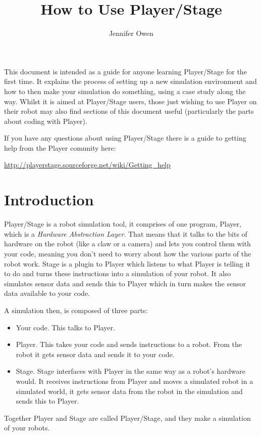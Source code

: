 \documentclass[a4paper]{article}
\title{How to Use Player/Stage}
\author{Jennifer Owen}
\newcommand{\plst}{Player/Stage\xspace}
\newcommand{\pl}{Player\xspace}
\begin{document}
\maketitle

This document is intended as a guide for anyone learning \plst for the first time. It explains the process of setting up a new simulation environment and how to then make your simulation do something, using a case study along the way. Whilst it is aimed at \plst users, those just wishing to use \pl on their robot may also find sections of this document useful (particularly the parts about coding with Player).

If you have any questions about using \plst there is a guide to getting help from the \pl comunity here:
\begin{center}
	\url{http://playerstage.sourceforge.net/wiki/Getting_help}
\end{center}

\newpage
\tableofcontents

\newpage
\section{Introduction}
\plst is a robot simulation tool, it comprises of one program, \pl, which is a \emph{Hardware Abstraction Layer}. That means that it talks to the bits of hardware on the robot (like a claw or a camera) and lets you control them with your code, meaning you don't need to worry about how the various parts of the robot work. Stage is a plugin to \pl which listens to what \pl is telling it to do and turns these instructions into a simulation of your robot. It also simulates sensor data and sends this to \pl which in turn makes the sensor data available to your code.

A simulation then, is composed of three parts:
\begin{itemize}
\item Your code. This talks to \pl.
\item \pl. This takes your code and sends instructions to a robot. From the robot it gets sensor data and sends it to your code.
\item Stage. Stage interfaces with \pl in the same way as a robot's hardware would. It receives instructions from \pl and moves a simulated robot in a simulated world, it gets sensor data from the robot in the simulation and sends this to \pl.
\end{itemize}
Together \pl and Stage are called \plst, and they make a simulation of your robots.
\end{document}
